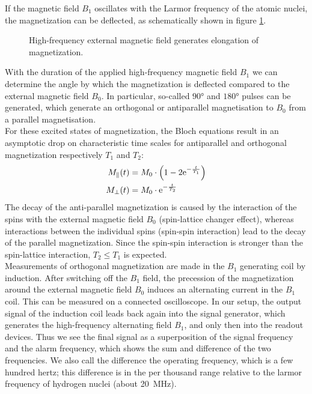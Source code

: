 If the magnetic field $B_1$ oscillates with the Larmor frequency of the atomic nuclei, the magnetization can be deflected, as schematically shown in figure \ref{fig:magnet}.
\begin{figure}[ht]
\centering

\caption{High-frequency external magnetic field generates elongation of magnetization.}
\label{fig:magnet}
\end{figure}
With the duration of the applied high-frequency magnetic field $B_1$ we can determine the angle by which the magnetization is deflected compared to the external magnetic field $B_0$.
In particular, so-called $\ang{90}$ and $\ang{180}$ pulses can be generated, which generate an orthogonal or antiparallel magnetisation to $B_0$ from a parallel magnetisation.\\

For these excited states of magnetization, the Bloch equations result in an asymptotic drop on characteristic time scales for antiparallel and orthogonal magnetization respectively $T_1$ and $T_2$:
\begin{align}
M_\parallel(t)&=M_0\cdot\left(1-2\mathrm{e}^{-\frac{t}{T_1}}\right) \label{eq:t1}\\
M_\bot(t)&=M_0\cdot\mathrm{e}^{-\frac{t}{T_2}}
\label{eq:t2}
\end{align}
The decay of the anti-parallel magnetization is caused by the interaction of the spins with the external magnetic field $B_0$ (spin-lattice changer effect), whereas interactions between the individual spins (spin-spin interaction) lead to the decay of the parallel magnetization.
Since the spin-spin interaction is stronger than the spin-lattice interaction, $T_2\leq T_1$ is expected.\\
Measurements of orthogonal magnetization are made in the $B_1$ generating coil by induction.
After switching off the $B_1$ field, the precession of the magnetization around the external magnetic field $B_0$ induces an alternating current in the $B_1$ coil.
This can be measured on a connected oscilloscope.
In our setup, the output signal of the induction coil leads back again into the signal generator, which generates the high-frequency alternating field $B_1$, and only then into the readout devices.
Thus we see the final signal as a superposition of the signal frequency and the alarm frequency, which shows the sum and difference of the two frequencies.
We also call the difference the operating frequency, which is a few hundred hertz; this difference is in the per thousand range relative to the larmor frequency of hydrogen nuclei (about \SI{20}{\mega\hertz}).\\

